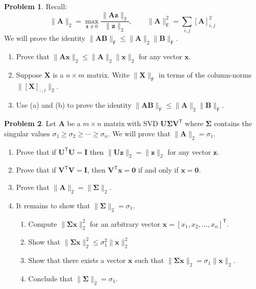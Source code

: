 \documentclass[12pt]{article}
\theoremstyle{definition}
\newtheorem{problem}{Problem}
\renewcommand{\vec}{\mathbf}
\newcommand{\T}{\mathsf{T}}
\newcommand{\F}{\mathsf{F}}
\begin{document}
\hfill

\begin{problem}
Recall:
\[
\| \vec{A} \|_2 = \max_{\vec{z} \neq 0} \frac{\| \vec{A}\vec{z} \|_2}{\| \vec{z} \|_2}
,\qquad
\| \vec{A} \|_\F^2 = \sum_{i,j} [\vec{A}]_{i,j}^2 
\]
We will prove the identity $\|\vec{A}\vec{B}\|_\F \leq \|\vec{A}\|_2 \| \vec{B} \|_\F$.
\begin{enumerate}
    \item 
        Prove that $\| \vec{A}\vec{x} \|_2 \leq \|\vec{A}\|_2 \|\vec{x}\|_2$ for any vector $\vec{x}$.
    \item 
        Suppose $\vec{X}$ is a $n\times m$ matrix. 
        Write $\|\vec{X}\|_\F$ in terms of the column-norms $\|[\vec{X}]_{:,i}\|_2$.
    \item Use (a) and (b) to prove the identity $\|\vec{A}\vec{B}\|_\F \leq \|\vec{A}\|_2 \| \vec{B} \|_\F$.
\end{enumerate}

\end{problem}

\clearpage
\begin{problem}
    Let $\vec{A}$ be a $m\times n$ matrix with SVD $\vec{U}\vec{\Sigma}\vec{V}^\T$ where $\vec{\Sigma}$ contains the singular values $\sigma_1 \geq \sigma_2 \geq \cdots \geq \sigma_n$.
    We will prove that $\|\vec{A}\|_2 = \sigma_1$.
    \begin{enumerate}
        \item Prove that if $\vec{U}^\T\vec{U} = \vec{I}$ then $\|\vec{U}\vec{z}\|_2 = \|\vec{z}\|_2$ for any vector $\vec{z}$.
        \item Prove that if $\vec{V}^\T\vec{V} = \vec{I}$, then $\vec{V}^\T \vec{x} = \vec{0}$ if and only if $\vec{x} = \vec{0}$.
        \item Prove that $\|\vec{A}\|_2 = \|\vec{\Sigma}\|_2$.
        \item It remains to show that $\|\vec{\Sigma}\|_2 = \sigma_1$.
        \begin{enumerate}[label=(\roman*)]
            \item  Compute $\|\vec{\Sigma}\vec{x}\|_2^2$ for an arbitrary vector $\vec{x} = [x_1, x_2, \ldots, x_n]^\T$.
            \item Show that $\|\vec{\Sigma}\vec{x}\|_2^2 \leq \sigma_1^2 \| \vec{x}\|_2^2$
            \item Show that there exists a vector $\vec{x}$ such that $\|\vec{\Sigma}\vec{x}\|_2 = \sigma_1 \| \vec{x}\|_2$.
            \item Conclude that $\|\vec{\Sigma}\|_2 = \sigma_1$.
        \end{enumerate}

    \end{enumerate}
\end{problem}
\end{document}

